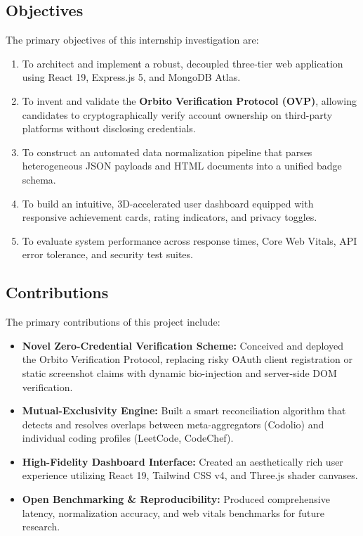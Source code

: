 \documentclass[12pt,a4paper]{article}
\begin{document}
\subsection{Objectives}
The primary objectives of this internship investigation are:
\begin{enumerate}[leftmargin=*]
    \item To architect and implement a robust, decoupled three-tier web application using React 19, Express.js 5, and MongoDB Atlas.
    \item To invent and validate the \textbf{Orbito Verification Protocol (OVP)}, allowing candidates to cryptographically verify account ownership on third-party platforms without disclosing credentials.
    \item To construct an automated data normalization pipeline that parses heterogeneous JSON payloads and HTML documents into a unified badge schema.
    \item To build an intuitive, 3D-accelerated user dashboard equipped with responsive achievement cards, rating indicators, and privacy toggles.
    \item To evaluate system performance across response times, Core Web Vitals, API error tolerance, and security test suites.
\end{enumerate}

\subsection{Contributions}
The primary contributions of this project include:
\begin{itemize}[leftmargin=*]
    \item \textbf{Novel Zero-Credential Verification Scheme:} Conceived and deployed the Orbito Verification Protocol, replacing risky OAuth client registration or static screenshot claims with dynamic bio-injection and server-side DOM verification.
    \item \textbf{Mutual-Exclusivity Engine:} Built a smart reconciliation algorithm that detects and resolves overlaps between meta-aggregators (Codolio) and individual coding profiles (LeetCode, CodeChef).
    \item \textbf{High-Fidelity Dashboard Interface:} Created an aesthetically rich user experience utilizing React 19, Tailwind CSS v4, and Three.js shader canvases.
    \item \textbf{Open Benchmarking \& Reproducibility:} Produced comprehensive latency, normalization accuracy, and web vitals benchmarks for future research.
\end{itemize}
\end{document}
